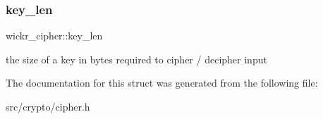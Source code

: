 \subsubsection{\texorpdfstring{key\+\_\+len}{key\_len}}
{\footnotesize\ttfamily wickr\+\_\+cipher\+::key\+\_\+len}

the size of a key in bytes required to cipher / decipher input 

The documentation for this struct was generated from the following file\+:\begin{DoxyCompactItemize}
\item 
src/crypto/cipher.\+h\end{DoxyCompactItemize}
